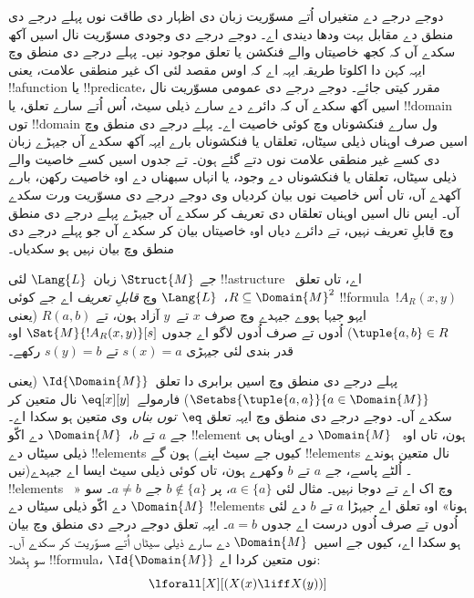 \documentclass[../../../include/open-logic-section]{subfiles}
\begin{document}

\begin{explain}
دوجے درجے دے متغیراں اُتے مسوّریت زبان دی
اظہار دی طاقت نوں پہلے درجے دی منطق دے مقابل
بہت ودھا دیندی اے۔ دوجے درجے دی وجودی مسوّریت
نال اسیں آکھ سکدے آں کہ کجھ خاصیتاں والے فنکشن یا تعلق موجود نیں۔ پہلے درجے دی منطق
وچ ایہہ کہن دا اکلوتا طریقہ ایہہ اے کہ اوس مقصد
لئی اک غیر منطقی علامت، یعنی !!a{function}
یا !!{predicate}، مقرر کیتی جائے۔ دوجے درجے
دی عمومی مسوّریت نال اسیں آکھ سکدے آں کہ
دائرے دے سارے ذیلی سیٹ، اُس اُتے سارے
تعلق، یا !!{domain} توں !!{domain} ول سارے
فنکشوناں وچ کوئی خاصیت اے۔ پہلے درجے دی
منطق وچ اسیں صرف اوہناں ذیلی سیٹاں، تعلقاں
یا فنکشوناں بارے ایہہ آکھ سکدے آں جیہڑے زبان
دی کسے غیر منطقی علامت نوں دتے گئے ہون۔
تے جدوں اسیں کسے خاصیت والے ذیلی سیٹاں،
تعلقاں یا فنکشوناں دے وجود، یا انہاں سبھناں
دے اوہ خاصیت رکھن، بارے آکھدے آں، تاں اُس
خاصیت نوں بیان کردیاں وی دوجے درجے دی مسوّریت
ورت سکدے آں۔ ایس نال اسیں اوہناں تعلقاں دی تعریف کر سکدے آں
جیہڑے پہلے درجے دی منطق وچ قابلِ تعریف نہیں، تے دائرے دیاں اوہ خاصیتاں
بیان کر سکدے آں جو پہلے درجے دی منطق وچ
بیان نہیں ہو سکدیاں۔
\end{explain}

\begin{defn}
جے $\Struct{M}$ زبان~$\Lang{L}$ لئی
!!a{structure} اے، تاں تعلق~$R \subseteq
\Domain{M}^2$،~$\Lang{L}$ وچ
\emph{قابلِ تعریف} اے جے کوئی !!{formula}~$!A_R(x, y)$
ایہو جیہا ہووے جیہدے وچ صرف $x$
تے~$y$ آزاد ہون، تے $R(a, b)$
(یعنی $\tuple{a,b} \in R$) اُدوں تے صرف
اُدوں لاگو اے جدوں $\Sat{M}{!A_R(x, y)}[s]$
اوہ قدر بندی لئی جیہڑی $s(x) = a$
تے $s(y) = b$ رکھے۔
\end{defn}

\begin{ex}
پہلے درجے دی منطق وچ اسیں برابری دا
تعلق~$\Id{\Domain{M}}$ (یعنی
$\Setabs{\tuple{a,a}}{a \in
  \Domain{M}}$) فارمولے~$\eq[x][y]$
نال متعین کر سکدے آں۔ دوجے درجے دی منطق وچ
ایہہ تعلق \emph{$\eq$ توں بناں} وی متعین ہو سکدا اے۔ جے $a$ تے $b$،~$\Domain{M}$
دے اکّو !!{element} ہون، تاں اوہ
~$\Domain{M}$ دے اوہناں ہی ذیلی سیٹاں دے
!!{element}s ہون گے (کیوں جے سیٹ اپنے
!!{element}s نال متعین ہوندے نیں)۔
اُلٹے پاسے، جے $a$ تے $b$ وکھرے ہون،
تاں کوئی ذیلی سیٹ ایسا اے جیہدے !!{element}s وچ اک اے
تے دوجا نہیں۔ مثال لئی $a \in \{a\}$،
پر $b
\notin \{a\}$ جے $a \neq b$۔
سو «~$\Domain{M}$ دے اکّو ذیلی سیٹاں دے
!!{element}s ہونا» اوہ تعلق اے جیہڑا
$a$ تے $b$ دے لئی اُدوں تے صرف اُدوں
درست اے جدوں $a = b$۔ ایہہ تعلق
دوجے درجے دی منطق وچ بیان ہو سکدا اے،
کیوں جے اسیں~$\Domain{M}$ دے سارے
ذیلی سیٹاں اُتے مسوّریت کر سکدے آں۔
سو ہِٹھلا !!{formula}،
$\Id{\Domain{M}}$ نوں متعین کردا اے:
\[
\lforall[X][(X(x) \liff X(y))]
\]
\end{ex}
\end{document}
